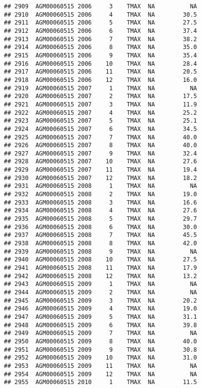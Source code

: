 \documentclass{article}\usepackage[]{graphicx}\usepackage[]{color}
\makeatletter
\newenvironment{kframe}{%
 \def\at@end@of@kframe{}%
 \ifinner\ifhmode%
  \def\at@end@of@kframe{\end{minipage}}%
  \begin{minipage}{\columnwidth}%
 \fi\fi%
 \def\FrameCommand##1{\hskip\@totalleftmargin \hskip-\fboxsep
 \colorbox{shadecolor}{##1}\hskip-\fboxsep
     \hskip-\linewidth \hskip-\@totalleftmargin \hskip\columnwidth}%
 \MakeFramed {\advance\hsize-\width
   \@totalleftmargin\z@ \linewidth\hsize
   \@setminipage}}%
 {\par\unskip\endMakeFramed%
 \at@end@of@kframe}
\newenvironment{knitrout}{}{} %
\makeatother
\begin{document}
\begin{knitrout}
\begin{kframe}
\begin{verbatim}
## 2909  AGM00060515 2006     3    TMAX  NA          NA
## 2910  AGM00060515 2006     4    TMAX  NA        30.5
## 2911  AGM00060515 2006     5    TMAX  NA        27.5
## 2912  AGM00060515 2006     6    TMAX  NA        37.4
## 2913  AGM00060515 2006     7    TMAX  NA        38.2
## 2914  AGM00060515 2006     8    TMAX  NA        35.0
## 2915  AGM00060515 2006     9    TMAX  NA        35.4
## 2916  AGM00060515 2006    10    TMAX  NA        28.4
## 2917  AGM00060515 2006    11    TMAX  NA        20.5
## 2918  AGM00060515 2006    12    TMAX  NA        16.0
## 2919  AGM00060515 2007     1    TMAX  NA          NA
## 2920  AGM00060515 2007     2    TMAX  NA        17.5
## 2921  AGM00060515 2007     3    TMAX  NA        11.9
## 2922  AGM00060515 2007     4    TMAX  NA        25.2
## 2923  AGM00060515 2007     5    TMAX  NA        25.1
## 2924  AGM00060515 2007     6    TMAX  NA        34.5
## 2925  AGM00060515 2007     7    TMAX  NA        40.0
## 2926  AGM00060515 2007     8    TMAX  NA        40.0
## 2927  AGM00060515 2007     9    TMAX  NA        32.4
## 2928  AGM00060515 2007    10    TMAX  NA        27.6
## 2929  AGM00060515 2007    11    TMAX  NA        19.4
## 2930  AGM00060515 2007    12    TMAX  NA        18.2
## 2931  AGM00060515 2008     1    TMAX  NA          NA
## 2932  AGM00060515 2008     2    TMAX  NA        19.0
## 2933  AGM00060515 2008     3    TMAX  NA        16.6
## 2934  AGM00060515 2008     4    TMAX  NA        27.6
## 2935  AGM00060515 2008     5    TMAX  NA        29.7
## 2936  AGM00060515 2008     6    TMAX  NA        30.0
## 2937  AGM00060515 2008     7    TMAX  NA        45.5
## 2938  AGM00060515 2008     8    TMAX  NA        42.0
## 2939  AGM00060515 2008     9    TMAX  NA          NA
## 2940  AGM00060515 2008    10    TMAX  NA        27.5
## 2941  AGM00060515 2008    11    TMAX  NA        17.9
## 2942  AGM00060515 2008    12    TMAX  NA        13.2
## 2943  AGM00060515 2009     1    TMAX  NA          NA
## 2944  AGM00060515 2009     2    TMAX  NA          NA
## 2945  AGM00060515 2009     3    TMAX  NA        20.2
## 2946  AGM00060515 2009     4    TMAX  NA        19.0
## 2947  AGM00060515 2009     5    TMAX  NA        31.1
## 2948  AGM00060515 2009     6    TMAX  NA        39.8
## 2949  AGM00060515 2009     7    TMAX  NA          NA
## 2950  AGM00060515 2009     8    TMAX  NA        40.0
## 2951  AGM00060515 2009     9    TMAX  NA        30.8
## 2952  AGM00060515 2009    10    TMAX  NA        31.0
## 2953  AGM00060515 2009    11    TMAX  NA          NA
## 2954  AGM00060515 2009    12    TMAX  NA          NA
## 2955  AGM00060515 2010     1    TMAX  NA        11.5

\end{verbatim}
\end{kframe}
\end{knitrout}
\end{document}
